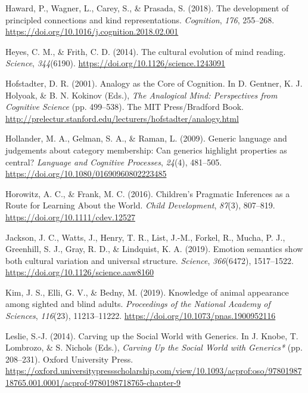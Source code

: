 \documentclass[11pt,man]{article}
\newlength{\cslhangindent}
\newenvironment{cslreferences}%
  {\setlength{\parindent}{0pt}%
  \everypar{\setlength{\hangindent}{\cslhangindent}}\ignorespaces}%
  {\par}
\begin{document}
\begin{cslreferences}
\leavevmode\hypertarget{ref-haward_development_2018}{}%
Haward, P., Wagner, L., Carey, S., \& Prasada, S. (2018). The
development of principled connections and kind representations.
\emph{Cognition}, \emph{176}, 255--268.
\url{https://doi.org/10.1016/j.cognition.2018.02.001}

\leavevmode\hypertarget{ref-heyes_cultural_2014}{}%
Heyes, C. M., \& Frith, C. D. (2014). The cultural evolution of mind
reading. \emph{Science}, \emph{344}(6190).
\url{https://doi.org/10.1126/science.1243091}

\leavevmode\hypertarget{ref-hofstadter_analogy_2001}{}%
Hofstadter, D. R. (2001). Analogy as the Core of Cognition. In D.
Gentner, K. J. Holyoak, \& B. N. Kokinov (Eds.), \emph{The Analogical
Mind: Perspectives from Cognitive Science} (pp. 499--538). The MIT
Press/Bradford Book.
\url{http://prelectur.stanford.edu/lecturers/hofstadter/analogy.html}

\leavevmode\hypertarget{ref-hollander_generic_2009}{}%
Hollander, M. A., Gelman, S. A., \& Raman, L. (2009). Generic language
and judgements about category membership: Can generics highlight
properties as central? \emph{Language and Cognitive Processes},
\emph{24}(4), 481--505. \url{https://doi.org/10.1080/01690960802223485}

\leavevmode\hypertarget{ref-horowitz_childrens_2016}{}%
Horowitz, A. C., \& Frank, M. C. (2016). Children's Pragmatic Inferences
as a Route for Learning About the World. \emph{Child Development},
\emph{87}(3), 807--819. \url{https://doi.org/10.1111/cdev.12527}

\leavevmode\hypertarget{ref-jackson_emotion_2019}{}%
Jackson, J. C., Watts, J., Henry, T. R., List, J.-M., Forkel, R., Mucha,
P. J., Greenhill, S. J., Gray, R. D., \& Lindquist, K. A. (2019).
Emotion semantics show both cultural variation and universal structure.
\emph{Science}, \emph{366}(6472), 1517--1522.
\url{https://doi.org/10.1126/science.aaw8160}

\leavevmode\hypertarget{ref-kim_knowledge_2019}{}%
Kim, J. S., Elli, G. V., \& Bedny, M. (2019). Knowledge of animal
appearance among sighted and blind adults. \emph{Proceedings of the
National Academy of Sciences}, \emph{116}(23), 11213--11222.
\url{https://doi.org/10.1073/pnas.1900952116}

\leavevmode\hypertarget{ref-leslie_carving_2014}{}%
Leslie, S.-J. (2014). Carving up the Social World with Generics. In J.
Knobe, T. Lombrozo, \& S. Nichols (Eds.), \emph{Carving Up the Social
World with Generics*} (pp. 208--231). Oxford University Press.
\url{https://oxford.universitypressscholarship.com/view/10.1093/acprof:oso/9780198718765.001.0001/acprof-9780198718765-chapter-9}


\end{cslreferences}
\end{document}
